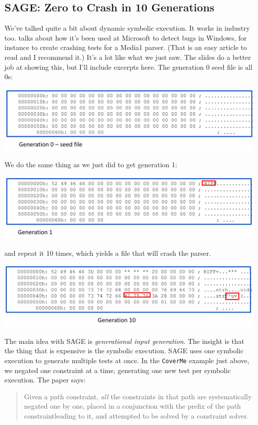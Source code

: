 \documentclass[11pt]{article}
\begin{document}
\subsection*{SAGE: Zero to Crash in 10 Generations}
We've talked quite a bit about dynamic symbolic execution. It works in industry too. \cite{godefroid12:_sage} talks about how it's been used at
Microsoft to detect bugs in Windows, for instance to create crashing tests for a Media1 parser. (That is an easy article to read and I recommend it.) It's a lot like what we just saw. The slides do a better job
at showing this, but I'll include excerpts here.
The generation 0 seed file is all 0s:

\includegraphics[width=.8\textwidth]{L09/gen0.png}

We do the same thing as we just did to get generation 1:

\includegraphics[width=.8\textwidth]{L09/gen1.png}

and repeat it 10 times, which yields a file that will crash the parser.

\includegraphics[width=.8\textwidth]{L09/gen10.png}

The main idea with SAGE is \emph{generational input generation}. The insight is that the thing that is expensive is the symbolic execution. SAGE uses one symbolic execution to generate multiple tests
at once. In the \texttt{CoverMe} example just above, we negated one constraint at a time, generating one new test per symbolic execution. The paper says:
\begin{quote}
  Given a path constraint,
  \emph{all} the constraints in that path are systematically negated one by one, placed in a conjunction with the prefix of the path constraintleading to it, and attempted to be solved by a constraint solver.
\end{quote}
\end{document}
